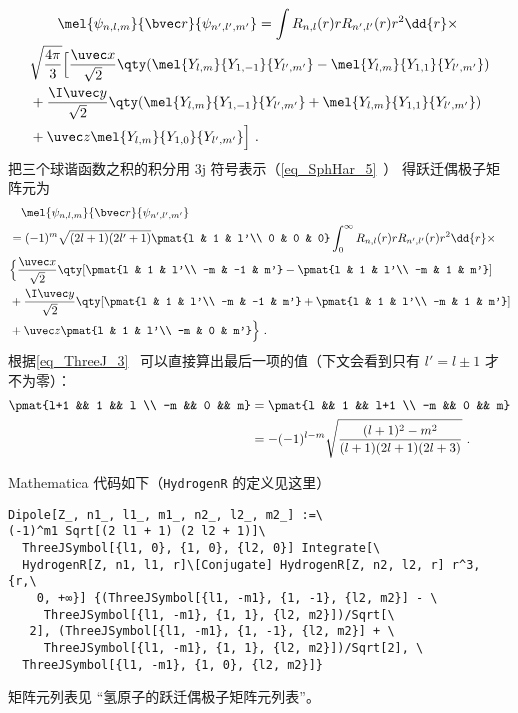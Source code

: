 \begin{equation}
\begin{aligned}
&\qquad \mel{\psi_{n,l,m}}{\bvec r}{\psi_{n',l',m'}}
= \int R_{n,l}(r) r R_{n',l'}(r) r^2 \dd{r}\times\\
&\sqrt{\frac{4\pi}{3}}\Big[\frac{\uvec x}{\sqrt 2} \qty(\mel{Y_{l,m}}{Y_{1,-1}}{Y_{l',m'}} - \mel{Y_{l,m}}{Y_{1,1}}{Y_{l',m'}})\\
&+ \frac{\I \uvec y}{\sqrt 2} \qty(\mel{Y_{l,m}}{Y_{1,-1}}{Y_{l',m'}} + \mel{Y_{l,m}}{Y_{1,1}}{Y_{l',m'}})\\
&+ \uvec z\mel{Y_{l,m}}{Y_{1,0}}{Y_{l',m'}}\Big]~.
\end{aligned}
\end{equation}
把三个球谐函数之积的积分用 3j 符号表示（\autoref{eq_SphHar_5}~） 得跃迁偶极子矩阵元为
\begin{equation}\label{eq_SelRul_1}
\begin{aligned}
&\quad\mel{\psi_{n,l,m}}{\bvec r}{\psi_{n',l',m'}}\\
&= (-1)^m\sqrt{(2l+1)(2l'+1)} \pmat{l & 1 & l'\\ 0 & 0 & 0} \int_0^\infty R_{n,l}(r) r R_{n',l'}(r) r^2 \dd{r}\times\\
&\Big\{\frac{\uvec x}{\sqrt 2} \qty[\pmat{l & 1 & l'\\ -m & -1 & m'} - \pmat{l & 1 & l'\\ -m & 1 & m'}]\\
&+ \frac{\I \uvec y}{\sqrt 2} \qty[\pmat{l & 1 & l'\\ -m & -1 & m'} + \pmat{l & 1 & l'\\ -m & 1 & m'}]\\
&+  \uvec z \pmat{l & 1 & l'\\ -m & 0 & m'}\Big\}~.
\end{aligned}
\end{equation}
根据\autoref{eq_ThreeJ_3}~ 可以直接算出最后一项的值（下文会看到只有 $l'=l\pm 1$ 才不为零）：
\begin{equation}
\begin{aligned}
\pmat{l+1 && 1 && l \\ -m && 0 && m} &= \pmat{l && 1 && l+1 \\ -m && 0 && m}\\
&= -(-1)^{l-m} \sqrt{\frac{(l+1)^2-m^2}{(l+1)(2l+1)(2l+3)}}~.
\end{aligned}
\end{equation}

Mathematica 代码如下（\verb|HydrogenR| 的定义见这里）
\begin{lstlisting}[language=mma]
Dipole[Z_, n1_, l1_, m1_, n2_, l2_, m2_] :=\
(-1)^m1 Sqrt[(2 l1 + 1) (2 l2 + 1)]\
  ThreeJSymbol[{l1, 0}, {1, 0}, {l2, 0}] Integrate[\
  HydrogenR[Z, n1, l1, r]\[Conjugate] HydrogenR[Z, n2, l2, r] r^3, {r,\
    0, +∞}] {(ThreeJSymbol[{l1, -m1}, {1, -1}, {l2, m2}] - \
     ThreeJSymbol[{l1, -m1}, {1, 1}, {l2, m2}])/Sqrt[\
   2], (ThreeJSymbol[{l1, -m1}, {1, -1}, {l2, m2}] + \
     ThreeJSymbol[{l1, -m1}, {1, 1}, {l2, m2}])/Sqrt[2], \
  ThreeJSymbol[{l1, -m1}, {1, 0}, {l2, m2}]}
\end{lstlisting}
矩阵元列表见 “氢原子的跃迁偶极子矩阵元列表\upref{HDipM}”。


